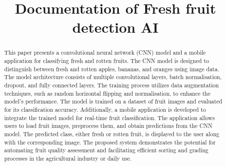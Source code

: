 \documentclass[conference]{IEEEtran}
\begin{document}
\title{Documentation of Fresh fruit detection AI}

\author{
\and
{}
\and
{}
}
\maketitle
\thispagestyle{plain}
\pagestyle{plain}

\begin{abstract}
This paper presents a convolutional neural network (CNN) model and a mobile application for classifying fresh and rotten fruits. The CNN model is designed to distinguish between fresh and rotten apples, bananas, and oranges using image data. The model architecture consists of multiple convolutional layers, batch normalisation, dropout, and fully connected layers. The training process utilizes data augmentation techniques, such as random horizontal flipping and normalisation, to enhance the model's performance. The model is trained on a dataset of fruit images and evaluated for its classification accuracy. Additionally, a mobile application is developed to integrate the trained model for real-time fruit classification. The application allows users to load fruit images, preprocess them, and obtain predictions from the CNN model. The predicted class, either fresh or rotten fruit, is displayed to the user along with the corresponding image. The proposed system demonstrates the potential for automating fruit quality assessment and facilitating efficient sorting and grading processes in the agricultural industry or daily use.
\end{abstract}
\end{document}
